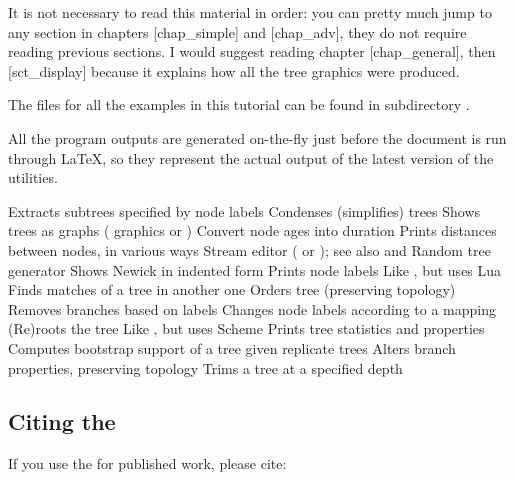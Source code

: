 It is not necessary to read this material in order: you can pretty much jump to
any section in chapters \in{}[chap_simple] and \in{}[chap_adv], they do not
require reading previous sections. I would suggest reading chapter
\in{}[chap_general], then [sct_display] because it explains how all
the tree graphics were produced.

The files for all the examples in this tutorial can be found in
subdirectory .

All the program outputs are generated on-the-fly just before the document is run
through \LaTeX{}, so they represent the actual output of the latest version of
the utilities.

\starttabulate[|l|l|]
  \MR
\HL
\NC \clade		\NC	Extracts subtrees specified by node labels \NC\MR
\NC \condense	\NC	Condenses (simplifies) trees \MR
\NC \display	\NC	Shows trees as graphs (\ascii{} graphics or \svg) \MR
\NC \duration	\NC	Convert node ages into duration \MR
\NC \distance	\NC	Prints distances between nodes, in various ways \MR
\NC \ed				\NC	Stream editor (  or ); see also \luaed{} and \sched \MR
\NC \gen			\NC	Random tree generator \MR
\NC \nwindent	\NC	Shows Newick in indented form \MR 
\NC {}		\NC	Prints node labels \MR
\NC \luaed				\NC	Like \ed, but uses Lua\MR
\NC \match		\NC	Finds matches of a tree in another one \MR
\NC \order		\NC	Orders tree (preserving topology) \MR
\NC \prune		\NC	Removes branches based on labels \MR 
\NC \rename		\NC	Changes node labels according to a mapping \MR
\NC \reroot		\NC	(Re)roots the tree \MR
\NC \sched				\NC	Like \luaed, but uses Scheme\MR
\NC \stats		\NC	Prints tree statistics and properties \MR
\NC \support	\NC	Computes bootstrap support of a tree given replicate trees \MR
\NC \topology	\NC	Alters branch properties, preserving topology \MR
\NC \trim		\NC	Trims a tree at a specified depth \MR
\stoptabulate

\subsection{Citing the \nutils}

\setupbibtex[database={citation},sort=author]
\setuppublications[alternative=apa]

If you use the \nutils{} for published work, please cite:
\placepublications[criterium=all]


